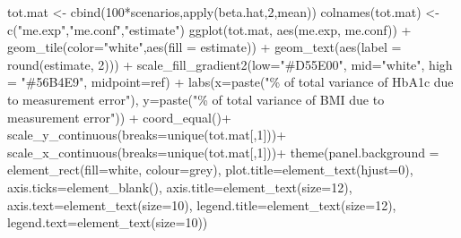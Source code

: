 \documentclass[
  letterpaper,
  DIV=11,
  numbers=noendperiod]{scrartcl}
\newenvironment{Shaded}{\begin{snugshade}}{\end{snugshade}}
\newcommand{\AttributeTok}[1]{\textcolor[rgb]{0.40,0.45,0.13}{#1}}
\newcommand{\DecValTok}[1]{\textcolor[rgb]{0.68,0.00,0.00}{#1}}
\newcommand{\FunctionTok}[1]{\textcolor[rgb]{0.28,0.35,0.67}{#1}}
\newcommand{\NormalTok}[1]{\textcolor[rgb]{0.00,0.23,0.31}{#1}}
\newcommand{\OtherTok}[1]{\textcolor[rgb]{0.00,0.23,0.31}{#1}}
\newcommand{\SpecialCharTok}[1]{\textcolor[rgb]{0.37,0.37,0.37}{#1}}
\newcommand{\StringTok}[1]{\textcolor[rgb]{0.13,0.47,0.30}{#1}}
\begin{document}
\begin{Shaded}
\begin{Highlighting}[]
\NormalTok{tot.mat }\OtherTok{\textless{}{-}} \FunctionTok{cbind}\NormalTok{(}\DecValTok{100}\SpecialCharTok{*}\NormalTok{scenarios,}\FunctionTok{apply}\NormalTok{(beta.hat,}\DecValTok{2}\NormalTok{,mean))}
\FunctionTok{colnames}\NormalTok{(tot.mat) }\OtherTok{\textless{}{-}} \FunctionTok{c}\NormalTok{(}\StringTok{"me.exp"}\NormalTok{,}\StringTok{"me.conf"}\NormalTok{,}\StringTok{"estimate"}\NormalTok{)}
\FunctionTok{ggplot}\NormalTok{(tot.mat, }\FunctionTok{aes}\NormalTok{(me.exp, me.conf)) }\SpecialCharTok{+}
  \FunctionTok{geom\_tile}\NormalTok{(}\AttributeTok{color=}\StringTok{"white"}\NormalTok{,}\FunctionTok{aes}\NormalTok{(}\AttributeTok{fill =}\NormalTok{ estimate)) }\SpecialCharTok{+}
  \FunctionTok{geom\_text}\NormalTok{(}\FunctionTok{aes}\NormalTok{(}\AttributeTok{label =} \FunctionTok{round}\NormalTok{(estimate, }\DecValTok{2}\NormalTok{))) }\SpecialCharTok{+}
  \FunctionTok{scale\_fill\_gradient2}\NormalTok{(}\AttributeTok{low=}\StringTok{"\#D55E00"}\NormalTok{,}
                       \AttributeTok{mid=}\StringTok{"white"}\NormalTok{,}
                       \AttributeTok{high =} \StringTok{"\#56B4E9"}\NormalTok{, }
                       \AttributeTok{midpoint=}\NormalTok{ref) }\SpecialCharTok{+}
  \FunctionTok{labs}\NormalTok{(}\AttributeTok{x=}\FunctionTok{paste}\NormalTok{(}\StringTok{"\% of total variance of HbA1c due to measurement error"}\NormalTok{), }
       \AttributeTok{y=}\FunctionTok{paste}\NormalTok{(}\StringTok{"\% of total variance of BMI due to measurement error"}\NormalTok{)) }\SpecialCharTok{+}
  \FunctionTok{coord\_equal}\NormalTok{()}\SpecialCharTok{+}
  \FunctionTok{scale\_y\_continuous}\NormalTok{(}\AttributeTok{breaks=}\FunctionTok{unique}\NormalTok{(tot.mat[,}\DecValTok{1}\NormalTok{]))}\SpecialCharTok{+}
  \FunctionTok{scale\_x\_continuous}\NormalTok{(}\AttributeTok{breaks=}\FunctionTok{unique}\NormalTok{(tot.mat[,}\DecValTok{1}\NormalTok{]))}\SpecialCharTok{+}
  \FunctionTok{theme}\NormalTok{(}\AttributeTok{panel.background =} \FunctionTok{element\_rect}\NormalTok{(}\AttributeTok{fill=}\StringTok{\textquotesingle{}white\textquotesingle{}}\NormalTok{, }\AttributeTok{colour=}\StringTok{\textquotesingle{}grey\textquotesingle{}}\NormalTok{), }
        \AttributeTok{plot.title=}\FunctionTok{element\_text}\NormalTok{(}\AttributeTok{hjust=}\DecValTok{0}\NormalTok{), }
        \AttributeTok{axis.ticks=}\FunctionTok{element\_blank}\NormalTok{(),}
        \AttributeTok{axis.title=}\FunctionTok{element\_text}\NormalTok{(}\AttributeTok{size=}\DecValTok{12}\NormalTok{),}
        \AttributeTok{axis.text=}\FunctionTok{element\_text}\NormalTok{(}\AttributeTok{size=}\DecValTok{10}\NormalTok{),}
        \AttributeTok{legend.title=}\FunctionTok{element\_text}\NormalTok{(}\AttributeTok{size=}\DecValTok{12}\NormalTok{),}
        \AttributeTok{legend.text=}\FunctionTok{element\_text}\NormalTok{(}\AttributeTok{size=}\DecValTok{10}\NormalTok{))}
\end{Highlighting}
\end{Shaded}
\end{document}
